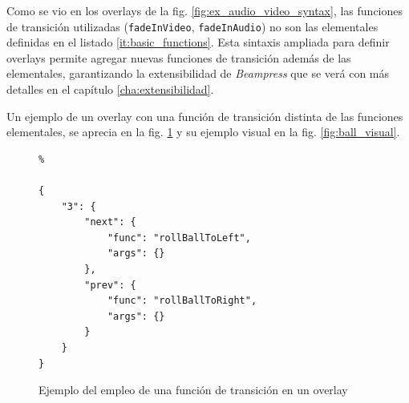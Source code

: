 		
		Como se vio en los overlays de la fig. \ref{fig:ex_audio_video_syntax}, las funciones de transición utilizadas (\texttt{fadeInVideo}, \texttt{fadeInAudio}) no son las elementales definidas en el listado \ref{it:basic_functions}. Esta sintaxis ampliada para definir overlays permite agregar nuevas funciones de transición además de las elementales, garantizando la extensibilidad de \textit{Beampress} que se verá con más detalles en el capítulo \ref{cha:extensibilidad}.


		Un ejemplo de un overlay con una función de transición distinta de las funciones elementales, se aprecia en la fig. \ref{fig:ball_code} y su ejemplo visual en la fig. \ref{fig:ball_visual}.



		\begin{figure}[htb]%
			\begin{lstlisting}%

{
    "3": {
        "next": {
            "func": "rollBallToLeft",
            "args": {}
        },
        "prev": {
            "func": "rollBallToRight",
            "args": {}
        }
    }
}
			\end{lstlisting}
		\caption{Ejemplo del empleo de una función de transición en un overlay} 
			\label{fig:ball_code} 
		\end{figure}	




